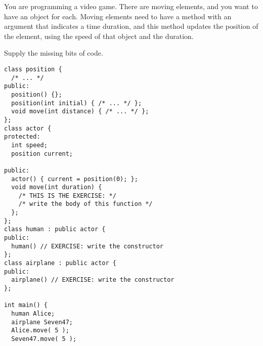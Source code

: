 \begin{exercise}
  You are programming a video game. There are moving elements, and you
  want to have an object for each. Moving elements need to have a
  method  with an argument that indicates a time duration, and
  this method updates the position of the element, using the speed of
  that object and the duration.

  Supply the missing bits of code.
\begin{verbatim}
class position {
  /* ... */
public:
  position() {};
  position(int initial) { /* ... */ };
  void move(int distance) { /* ... */ };
};
class actor {
protected:
  int speed;
  position current;

public:
  actor() { current = position(0); };
  void move(int duration) {
    /* THIS IS THE EXERCISE: */
    /* write the body of this function */
  };
};
class human : public actor {
public:
  human() // EXERCISE: write the constructor
};
class airplane : public actor {
public:
  airplane() // EXERCISE: write the constructor
};

int main() {
  human Alice;
  airplane Seven47;
  Alice.move( 5 );
  Seven47.move( 5 );
\end{verbatim}
\end{exercise}

